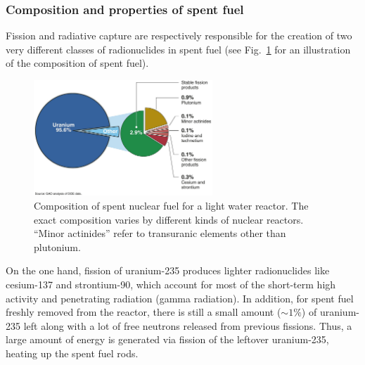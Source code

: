 \documentclass[nofootinbib,preprint,aps]{revtex4-1}
\begin{document}
        \subsubsection{Composition and properties of spent fuel}
        Fission and radiative capture are respectively responsible for the creation of two very
        different classes of radionuclides in spent fuel
        (see Fig.~\ref{fig:spentfuel} for an illustration of the composition of spent fuel).
        \begin{figure}[h]
            \centering
            \includegraphics[width=0.6\textwidth]{spent-fuel.png}
            \caption{Composition of spent nuclear fuel for a light water reactor. The exact composition varies
            by different kinds of nuclear reactors. ``Minor actinides'' refer to transuranic elements other than plutonium.\cite{gao}}
            \label{fig:spentfuel}
        \end{figure}

        On the one hand, fission of uranium-235 produces lighter radionuclides like cesium-137 and strontium-90, which
        account for most of the short-term high activity and penetrating radiation (gamma radiation).
        In addition, for spent fuel freshly removed from the reactor, there is still a small amount ($\sim 1\%$)
        of uranium-235 left along with a lot of free neutrons released from previous fissions. Thus, a large amount
        of energy is generated via fission of the leftover uranium-235, heating up the spent fuel rods.
\end{document}
